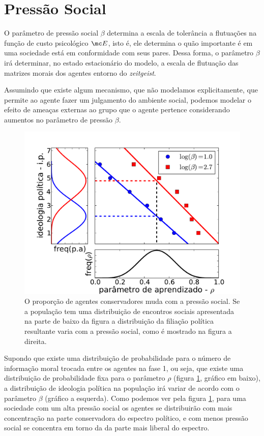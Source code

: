 \section{Pressão Social} %

O parâmetro de pressão social $\beta$ determina a escala de tolerância a
flutuações na função de custo psicológico $\mc E$, isto é, ele determina o quão
importante é em uma sociedade está em conformidade com seus pares. Dessa forma,
o parâmetro $\beta$ irá determinar, no estado estacionário do modelo, a escala
de flutuação das matrizes morais dos agentes entorno do \textit{zeitgeist}.

Assumindo que existe algum mecanismo, que não modelamos explicitamente, que
permite ao agente fazer um julgamento do ambiente social, podemos modelar
o efeito de ameaças externas ao grupo que o agente pertence considerando
aumentos no parâmetro de pressão $\beta$.

\begin{figure}
    \centering
    \includegraphics[scale=0.6]{Figures/dist-pa-rho.pdf}
    \caption{
        O proporção de  agentes conservadores muda com a pressão social.
        Se a população tem uma distribuição de encontros sociais apresentada na
        parte de baixo da figura a distribuição da filiação política
        resultante varia com a pressão social, como é mostrado na figura a
        direita.
    }
\label{fig:distpa}
\end{figure}

Supondo que existe uma distribuição de probabilidade para o número
de informação moral trocada entre os agentes na fase 1, ou seja, que
existe uma distribuição de probabilidade fixa para o parâmetro $\rho$
(figura \ref{fig:distpa}, gráfico em baixo), a distribuição de ideologia
política na população irá variar de acordo com o parâmetro $\beta$
(gráfico a esquerda). Como podemos ver pela figura \ref{fig:distpa}, para
uma sociedade com um alta pressão social os agentes se distribuirão com
mais concentração na parte conservadora do espectro político, e com menos
pressão social se concentra em torno da da parte mais liberal do espectro.

